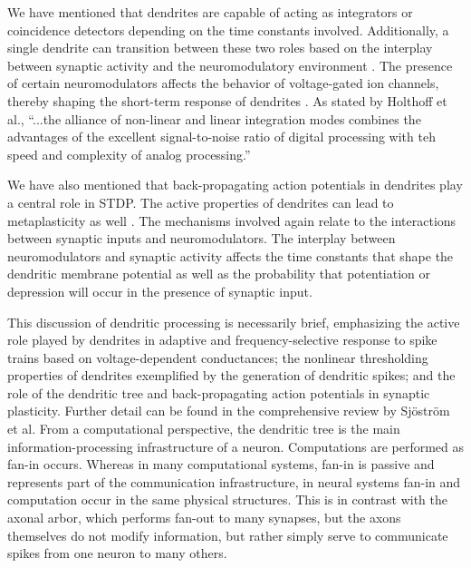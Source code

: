 We have mentioned that dendrites are capable of acting as integrators or coincidence detectors depending on the time constants involved. Additionally, a single dendrite can transition between these two roles based on the interplay between synaptic activity and the neuromodulatory environment \cite{hoko2006}. The presence of certain neuromodulators affects the behavior of voltage-gated ion channels, thereby shaping the short-term response of dendrites \cite{majo2005}. As stated by Holthoff et al., ``...the alliance of non-linear and linear integration modes combines the advantages of the excellent signal-to-noise ratio of digital processing with teh speed and complexity of analog processing.'' \cite{hoko2006} 

We have also mentioned that back-propagating action potentials in dendrites play a central role in STDP. The active properties of dendrites can lead to metaplasticity as well \cite{ab2008}. The mechanisms involved again relate to the interactions between synaptic inputs and neuromodulators. The interplay between neuromodulators and synaptic activity affects the time constants that shape the dendritic membrane potential as well as the probability that potentiation or depression will occur in the presence of synaptic input. 

This discussion of dendritic processing is necessarily brief, emphasizing the active role played by dendrites in adaptive and frequency-selective response to spike trains based on voltage-dependent conductances; the nonlinear thresholding properties of dendrites exemplified by the generation of dendritic spikes; and the role of the dendritic tree and back-propagating action potentials in synaptic plasticity. Further detail can be found in the comprehensive review by Sj\"{o}str\"{o}m et al. \cite{sjra2008} From a computational perspective, the dendritic tree is the main information-processing infrastructure of a neuron. Computations are performed as fan-in occurs. Whereas in many computational systems, fan-in is passive and represents part of the communication infrastructure, in neural systems fan-in and computation occur in the same physical structures. This is in contrast with the axonal arbor, which performs fan-out to many synapses, but the axons themselves do not modify information, but rather simply serve to communicate spikes from one neuron to many others. 

